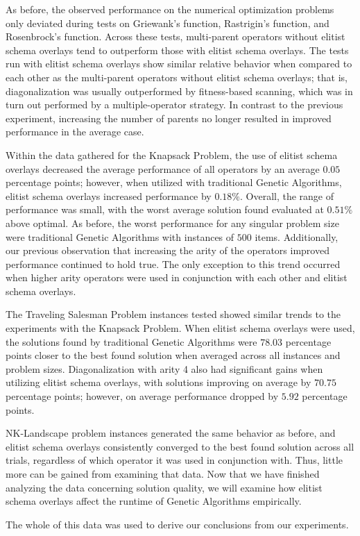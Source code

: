 %
%

As before, the observed performance on the numerical optimization problems only deviated during tests on Griewank's function, Rastrigin's function, and Rosenbrock's function. Across these tests, multi-parent operators without elitist schema overlays tend to outperform those with elitist schema overlays. The tests run with elitist schema overlays show similar relative behavior when compared to each other as the multi-parent operators without elitist schema overlays; that is, diagonalization was usually outperformed by fitness-based scanning, which was in turn out performed by a multiple-operator strategy. In contrast to the previous experiment, increasing the number of parents no longer resulted in improved performance in the average case.

%
%

Within the data gathered for the Knapsack Problem, the use of elitist schema overlays decreased the average performance of all operators by an average $0.05$ percentage points; however, when utilized with traditional Genetic Algorithms, elitist schema overlays increased performance by $0.18\%$. Overall, the range of performance was small, with the worst average solution found evaluated at $0.51\%$ above optimal. As before, the worst performance for any singular problem size were traditional Genetic Algorithms with instances of $500$ items. Additionally, our previous observation that increasing the arity of the operators improved performance continued to hold true. The only exception to this trend occurred when higher arity operators were used in conjunction with each other and elitist schema overlays.

%
%

The Traveling Salesman Problem instances tested showed similar trends to the experiments with the Knapsack Problem. When elitist schema overlays were used, the solutions found by traditional Genetic Algorithms were $78.03$ percentage points closer to the best found solution when averaged across all instances and problem sizes. Diagonalization with arity 4 also had significant gains when utilizing elitist schema overlays, with solutions improving on average by $70.75$ percentage points; however, on average performance dropped by $5.92$ percentage points.


NK-Landscape problem instances generated the same behavior as before, and elitist schema overlays consistently converged to the best found solution across all trials, regardless of which operator it was used in conjunction with. Thus, little more can be gained from examining that data. Now that we have finished analyzing the data concerning solution quality, we will examine how elitist schema overlays affect the runtime of Genetic Algorithms empirically. 

%
%

 The whole of this data was used to derive our conclusions from our experiments.